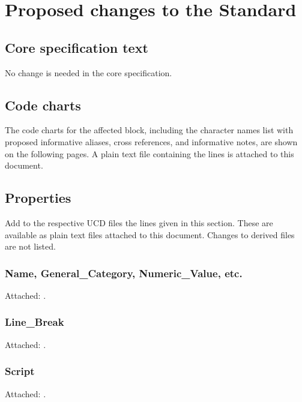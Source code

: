 \documentclass[10pt, a4paper, twoside]{article}
\begin{document}
\section{Proposed changes to the Standard}
\label{proposal}
\subsection{Core specification text}

No change is needed in the core specification.
\subsection{Code charts}
The code charts for the affected block,
including the character names list with proposed informative aliases, cross references, and informative notes,
are shown on the following pages.
A plain text file containing the
 lines is
attached to this document.
\vspace{0pt plus 0.5fill}
\begin{center}{}\end{center}
\vfill

\subsection{Properties}
\label{properties}
Add to the respective UCD files the lines given in this section.
These are available as plain text files attached to this document.
Changes to derived files are not listed.
\subsubsection{Name, General\_Category, Numeric\_Value, etc.}
Attached: .
\subsubsection{Line\_Break}
Attached: .
\subsubsection{Script}
Attached: .
\end{document}
